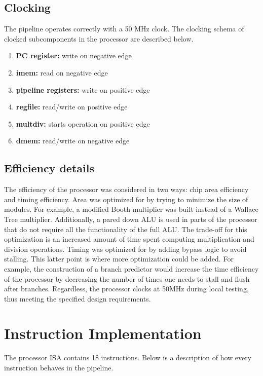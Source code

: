 \documentclass[letterpaper]{article}
\begin{document}
\subsection{Clocking}
The pipeline operates correctly with a 50 MHz clock. The clocking schema of clocked subcomponents in the processor are described below.
\begin{enumerate}
    \item \textbf{PC register:} write on negative edge
    \item \textbf{imem:} read on negative edge
    \item \textbf{pipeline registers:} write on positive edge
    \item \textbf{regfile:} read/write on positive edge
    \item \textbf{multdiv:} starts operation on positive edge
    \item \textbf{dmem:} read/write on negative edge
\end{enumerate}

\subsection{Efficiency details}
The efficiency of the processor was considered in two ways: chip area efficiency and timing efficiency. Area was optimized for by trying to minimize the size of modules. For example, a modified Booth multiplier was built instead of a Wallace Tree multiplier. Additionally, a pared down ALU is used in parts of the processor that do not require all the functionality of the full ALU. The trade-off for this optimization is an increased amount of time spent computing multiplication and division operations. Timing was optimized for by adding bypass logic to avoid stalling. This latter point is where more optimization could be added. For example, the construction of a branch predictor would increase the time efficiency of the processor by decreasing the number of times one needs to stall and flush after branches. Regardless, the processor clocks at 50MHz during local testing, thus meeting the specified design requirements.

\section{Instruction Implementation}
The processor ISA contains 18 instructions. Below is a  description of how every instruction behaves in the pipeline.
\end{document}
